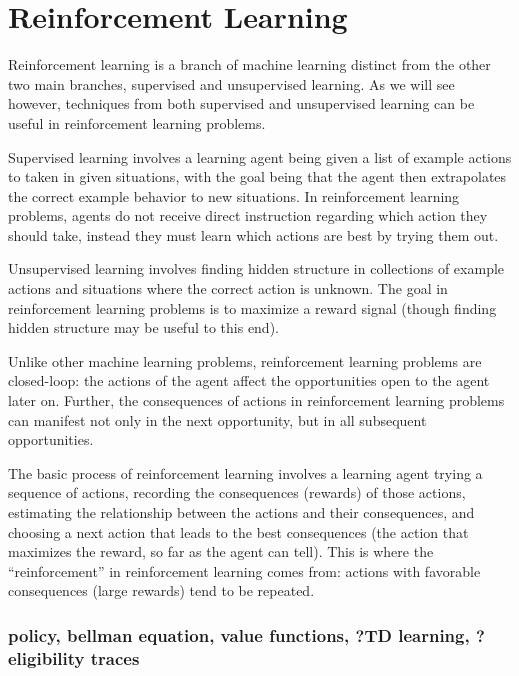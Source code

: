 \documentclass[12pt]{article}
\begin{document}

\section{Reinforcement Learning} %
\label{sec:reinforcement_learning}


Reinforcement learning is a branch of machine learning distinct from the other two main branches, supervised and unsupervised learning. As we will see however, techniques from both supervised and unsupervised learning can be useful in reinforcement learning problems.

Supervised learning involves a learning agent being given a list of example actions to taken in given situations, with the goal being that the agent then extrapolates the correct example behavior to new situations. In reinforcement learning problems, agents do not receive direct instruction regarding which action they should take, instead they must learn which actions are best by trying them out. 

Unsupervised learning involves finding hidden structure in collections of example actions and situations where the correct action is unknown. The goal in reinforcement learning problems is to maximize a reward signal (though finding hidden structure may be useful to this end).

Unlike other machine learning problems, reinforcement learning problems are closed-loop: the actions of the agent affect the opportunities open to the agent later on. Further, the consequences of actions in reinforcement learning problems can manifest not only in the next opportunity, but in all subsequent opportunities.


The basic process of reinforcement learning involves a learning agent trying a sequence of actions, recording the consequences (rewards) of those actions, estimating the relationship between the actions and their consequences, and choosing a next action that leads to the best consequences (the action that maximizes the reward, so far as the agent can tell). This is where the ``reinforcement'' in reinforcement learning comes from: actions with favorable consequences (large rewards) tend to be repeated.


\subsubsection{policy, bellman equation, value functions, ?TD learning, ?eligibility traces} %
\label{ssub:policy_bellman_equation_value_functions_td_learning_eligibility_traces}
\end{document}
